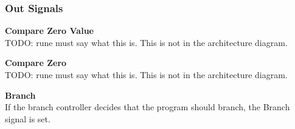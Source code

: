 \subsubsection{Out Signals}

\begin{description}
\item{\textbf{Compare Zero Value}} \\

TODO: rune must say what this is.
This is not in the architecture diagram.

\item{\textbf{Compare Zero}} \\

TODO: rune must say what this is.
This is not in the architecture diagram.

\item{\textbf{Branch}} \\

If the branch controller decides that the program should branch, the Branch signal is set.


\end{description}
